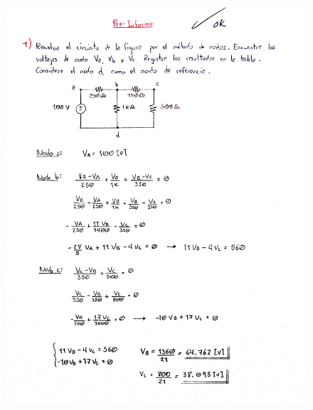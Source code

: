\documentclass[letter,11pt]{article}
\begin{document}
\begin{figure}[!h]
\centering
\includegraphics[scale=0.183]{resources/preinforme1.eps}
\end{figure}
\end{document}
